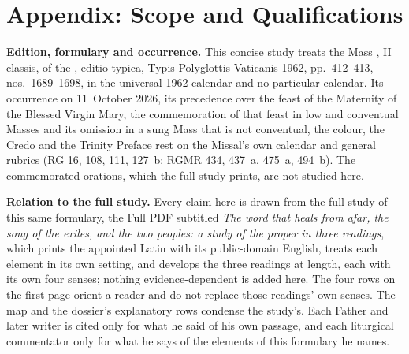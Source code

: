 
\section{Appendix: Scope and Qualifications}

{\footnotesize
\textbf{Edition, formulary and occurrence.} This concise study treats the Mass
, II classis, of the , editio typica, Typis Polyglottis Vaticanis 1962, pp.~412--413,
nos.~1689--1698, in the universal 1962 calendar and no particular calendar. Its
occurrence on 11~October 2026, its precedence over the feast of the Maternity
of the Blessed Virgin Mary, the commemoration of that feast in low and
conventual Masses and its omission in a sung Mass that is not conventual, the
colour, the Credo and the Trinity Preface rest on the Missal's own calendar and
general rubrics (RG 16, 108, 111, 127~b; RGMR 434, 437~a, 475~a, 494~b). The
commemorated orations, which the full study prints, are not studied here.

\textbf{Relation to the full study.} Every claim here is drawn from the full
study of this same formulary, the Full PDF subtitled \textit{The word that
heals from afar, the song of the exiles, and the two peoples: a study of the
proper in three readings}, which prints the appointed Latin with its
public-domain English, treats each element in its own setting, and develops the
three readings at length, each with its own four senses; nothing
evidence-dependent is added here. The four rows on the first page orient a
reader and do not replace those readings' own senses. The map and the
dossier's explanatory rows condense the study's. Each Father and later writer
is cited only for what he said of his own passage, and each liturgical
commentator only for what he says of the elements of this formulary he names.

}
